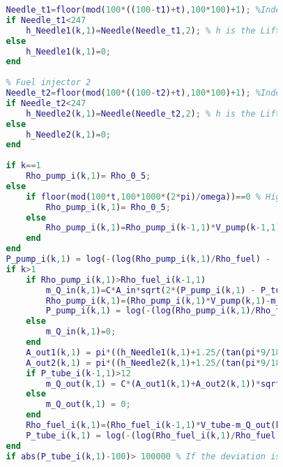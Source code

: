 \documentclass[withoutpreface,bwprint]{cumcmthesis} %
\begin{document}
\begin{appendices}
\begin{lstlisting}[language=matlab]
                % Fuel injector 1
                Needle_t1=floor(mod(100*((100-t1)+t),100*100)+1); %Index of time t in Needle data
                if Needle_t1<247
                    h_Needle1(k,1)=Needle(Needle_t1,2); % h is the Lift of Needle.
                else
                    h_Needle1(k,1)=0;
                end
                
                % Fuel injector 2
                Needle_t2=floor(mod(100*((100-t2)+t),100*100)+1); %Index of time t in Needle data
                if Needle_t2<247
                    h_Needle2(k,1)=Needle(Needle_t2,2); % h is the Lift of Needle.
                else
                    h_Needle2(k,1)=0;
                end
                
                if k==1
                    Rho_pump_i(k,1)= Rho_0_5; 
                else
                    if floor(mod(100*t,100*1000*(2*pi)/omega))==0 % High pressure oil pump replenishment operation.
                        Rho_pump_i(k,1)= Rho_0_5;
                    else
                        Rho_pump_i(k,1)=Rho_pump_i(k-1,1)*V_pump(k-1,1)/V_pump(k,1); % Fuel density in the oil pump at the current time.
                    end
                end
                P_pump_i(k,1) = log(-(log(Rho_pump_i(k,1)/Rho_fuel) - (exp(-0.39)/(0.0039*exp(7.31))))*0.0039*exp(7.31))*(-1/0.0039);
                if k>1 
                    if Rho_pump_i(k,1)>Rho_fuel_i(k-1,1) 
                        m_Q_in(k,1)=C*A_in*sqrt(2*(P_pump_i(k,1) - P_tube_i(k-1,1))*Rho_pump_i(k,1))*b;
                        Rho_pump_i(k,1)=(Rho_pump_i(k,1)*V_pump(k,1)-m_Q_in(k,1))/V_pump(k,1);
                        P_pump_i(k,1) = log(-(log(Rho_pump_i(k,1)/Rho_fuel) - (exp(-0.39)/(0.0039*exp(7.31))))*0.0039*exp(7.31))*(-1/0.0039);
                    else
                        m_Q_in(k,1)=0;
                    end
                    A_out1(k,1) = pi*((h_Needle1(k,1)+1.25/(tan(pi*9/180)))*tan(pi*9/180))^2-pi*1.25^2;
                    A_out2(k,1) = pi*((h_Needle2(k,1)+1.25/(tan(pi*9/180)))*tan(pi*9/180))^2-pi*1.25^2;
                    if P_tube_i(k-1,1)>12 
                        m_Q_out(k,1) = C*(A_out1(k,1)+A_out2(k,1))*sqrt(2*(P_tube_i(k-1,1) - 12)*Rho_fuel_i(k-1,1))*b;
                    else
                        m_Q_out(k,1) = 0;
                    end
                    Rho_fuel_i(k,1)=(Rho_fuel_i(k-1,1)*V_tube-m_Q_out(k,1)+m_Q_in(k,1))/V_tube;
                    P_tube_i(k,1) = log(-(log(Rho_fuel_i(k,1)/Rho_fuel) - (exp(-0.39)/(0.0039*exp(7.31))))*0.0039*exp(7.31))*(-1/0.0039);
                end
                if abs(P_tube_i(k,1)-100)> 100000 % If the deviation is greater than 5, the loop is jumped out and the next traversal is performed.

\end{lstlisting}
\end{appendices}
\end{document}
